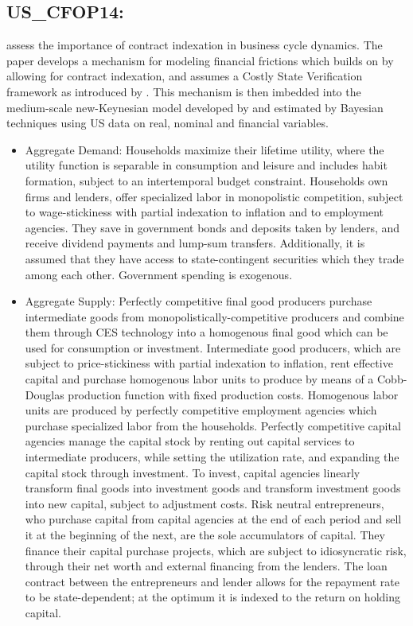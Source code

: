 \documentclass[11pt,a4paper]{article}
\begin{document}
	\subsection{US\_CFOP14: \cite{Carlstrometal2014}}
	\label{USCFOP14}
	\cite{Carlstrometal2014} assess the importance of contract indexation in business cycle dynamics. The paper develops a mechanism for modeling financial frictions which builds on \cite{BernankeGertlerGilchrist1999} by allowing for contract indexation, and assumes a Costly State Verification framework as introduced by \cite{townsend1979optimal}. This mechanism is then imbedded into the medium-scale new-Keynesian model developed by \cite{Justinianoetal2011} and estimated by Bayesian techniques using US data on real, nominal and financial variables.
	\begin{itemize}
		\item Aggregate Demand: Households maximize their lifetime utility, where the utility function is separable in consumption and leisure and includes habit formation, subject to an intertemporal budget constraint. Households own firms and lenders, offer specialized labor in monopolistic competition, subject to \cite{Calvo1983} wage-stickiness with partial indexation to inflation and to employment agencies. They save in government bonds and deposits taken by lenders, and receive dividend payments and lump-sum transfers. Additionally, it is assumed that they have access to state-contingent securities which they trade among each other. Government spending is exogenous.
		\item Aggregate Supply: Perfectly competitive final good producers purchase intermediate goods from monopolistically-competitive producers and combine them through CES technology into a homogenous final good which can be used for consumption or investment. Intermediate good producers, which are subject to \cite{Calvo1983} price-stickiness with partial indexation to inflation, rent effective capital and purchase homogenous labor units to produce by means of a Cobb-Douglas production function with fixed production costs. Homogenous labor units are produced by perfectly competitive employment agencies which purchase specialized labor from the households. Perfectly competitive capital agencies manage the capital stock by renting out capital services to intermediate producers, while setting the utilization rate, and expanding the capital stock through investment. To invest, capital agencies linearly transform final goods into investment goods and transform investment goods into new capital, subject to adjustment costs. Risk neutral entrepreneurs, who purchase capital from capital agencies at the end of each period and sell it at the beginning of the next, are the sole accumulators of capital. They finance their capital purchase projects, which are subject to idiosyncratic risk, through their net worth and external financing from the lenders. The loan contract between the entrepreneurs and lender allows for the repayment rate to be state-dependent; at the optimum it is indexed to the return on holding capital.

\end{itemize}
\end{document}

